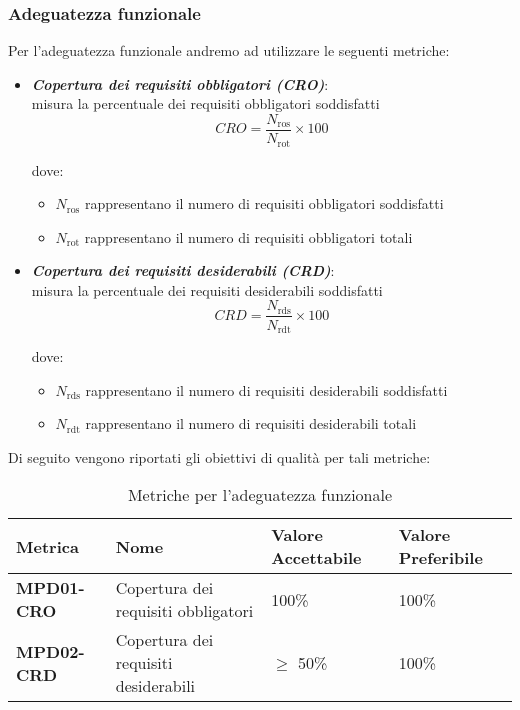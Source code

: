 \subsubsection{Adeguatezza funzionale}
Per l'adeguatezza funzionale andremo ad utilizzare le seguenti metriche:
\begin{itemize}
    \item \textbf{\emph{Copertura dei requisiti obbligatori (CRO)}}:\\
    misura la percentuale dei requisiti obbligatori soddisfatti
    \[
    CRO = \frac{N_{\text{ros}}}{N_{\text{rot}}} \times 100
    \]

    dove:
    \begin{itemize}
        \item \(N_{\text{ros}}\) rappresentano il numero di requisiti obbligatori soddisfatti
        \item \(N_{\text{rot}}\) rappresentano il numero di requisiti obbligatori totali
    \end{itemize}
    \item \textbf{\emph{Copertura dei requisiti desiderabili (CRD)}}:\\
    misura la percentuale dei requisiti desiderabili soddisfatti
    \[
    CRD = \frac{N_{\text{rds}}}{N_{\text{rdt}}} \times 100
    \]

    dove:
    \begin{itemize}
        \item \(N_{\text{rds}}\) rappresentano il numero di requisiti desiderabili soddisfatti
        \item \(N_{\text{rdt}}\) rappresentano il numero di requisiti desiderabili totali
    \end{itemize}
\end{itemize}
Di seguito vengono riportati gli obiettivi di qualità per tali metriche:
\begin{table}[htbp]
    \centering
    \begin{tabular}{|>{\centering\arraybackslash}p{4cm}|p{4cm}|p{4cm}|p{4cm}|}
    \hline
    \rowcolor{gray!30}
    \textbf{Metrica} & \textbf{Nome} & \textbf{Valore Accettabile} & \textbf{Valore Preferibile} \\
    \hline
    \rowcolor{gray!10}
    \textbf{MPD01-CRO} & Copertura dei requisiti obbligatori & 100\% & 100\% \\
    \hline
    \rowcolor{gray!10}
    \textbf{MPD02-CRD} & Copertura dei requisiti desiderabili & $\geq$ 50\% & 100\% \\
    \hline
    \end{tabular}
    \caption{Metriche per l'adeguatezza funzionale}
    \label{tab:metriche_adeguatezza_funzionale}
\end{table}
\newpage

